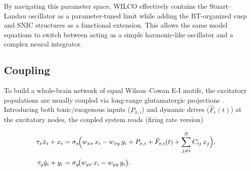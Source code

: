 \documentclass[12pt]{article}
\numberwithin{equation}{section}
\begin{document}
{By navigating this parameter space, WILCO effectively contains the Stuart–Landau oscillator as a parameter-tuned limit while adding the BT-organized cusp and SNIC structures as a functional extension. This allows the same model equations to switch between acting as a simple harmonic-like oscillator and a complex neural integrator.
}



\subsection{Coupling}

To build a whole-brain network of equal Wilson–Cowan E-I  motifs,  the excitatory populations are usually coupled via long-range glutamatergic projections \cite{castaldo2023multi}.  Introducing both tonic/exogenous inputs ($P_{x,i}$) and dynamic drives ($\hat F_e(t)$) at the excitatory nodes, the coupled system reads (firing rate version)
\begin{tcolorbox}[
  colback=gray!5,
  colframe=gray!5, %
  boxrule=0pt,
  enhanced, sharp corners,
  left=4pt, right=4pt, top=3pt, bottom=3pt,
  boxsep=2pt,
  before skip=6pt, after skip=6pt
]
\begin{equation} 
\begin{aligned}
  \tau_x \dot{x}_i + x_i 
    &= \sigma_x\!\Bigl(
         w_{xx}\,x_i 
       - w_{xy}\,y_i 
        + P_{x,i} 
       + \hat F_{e;i}(t) + \sum_{j\neq i }^N C_{ij}\,x_j\Bigr)
       ,
  \label{eq:WILCO_net_x}\\[4pt]
  \tau_y \dot{y}_i + y_i 
    &= \sigma_y\!\bigl(
         w_{yx}\,x_i 
       - w_{yy}\,y_i
       \bigr).
\end{aligned}
\end{equation}
\end{tcolorbox}
\end{document}
